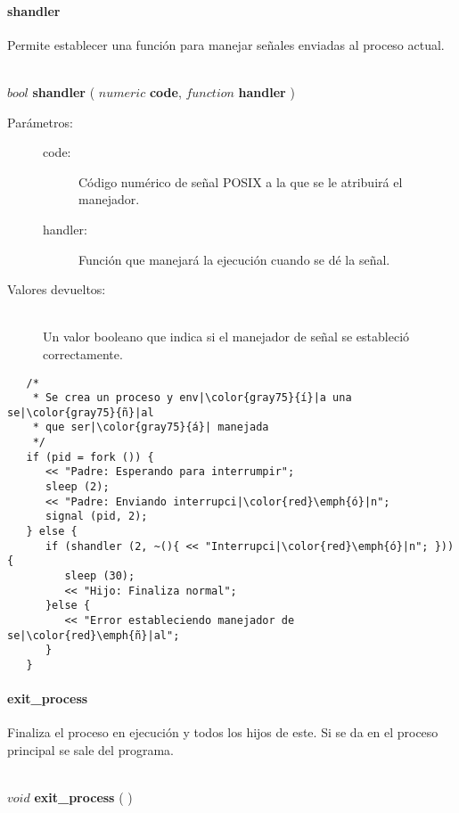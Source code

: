 \paragraph{shandler}
Permite establecer una función para manejar señales enviadas al proceso actual. 

\begin{framed}
\hfill \\ $bool$ \textbf{shandler} ( $numeric$ \textbf{code}, $function$ \textbf{handler} )  
\begin{description}
\item [Parámetros:] \hfill 
   \begin{description}
   \item[code:] Código numérico de señal POSIX a la que se le atribuirá el manejador.
   \item[handler:] Función que manejará la ejecución cuando se dé la señal.
   \end{description}
\item[Valores devueltos:] \hfill \\
   Un valor booleano que indica si el manejador de señal se estableció correctamente. 
\end{description}
\end{framed}
     
\begin{lstlisting}  
   /*
    * Se crea un proceso y env|\color{gray75}{í}|a una se|\color{gray75}{ñ}|al 
    * que ser|\color{gray75}{á}| manejada
    */
   if (pid = fork ()) {
      << "Padre: Esperando para interrumpir";
      sleep (2);
      << "Padre: Enviando interrupci|\color{red}\emph{ó}|n";
      signal (pid, 2);
   } else {
      if (shandler (2, ~(){ << "Interrupci|\color{red}\emph{ó}|n"; })){
         sleep (30);
         << "Hijo: Finaliza normal";
      }else {
         << "Error estableciendo manejador de se|\color{red}\emph{ñ}|al";
      }
   }
\end{lstlisting}

\paragraph{exit\_process}
Finaliza el proceso en ejecución y todos los hijos de este. Si se da en el
proceso principal se sale del programa.

\begin{framed}
\hfill \\ $void$ \textbf{exit\_process} ( )  
\end{framed}
     
